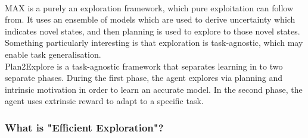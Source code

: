 \\ MAX \cite{DBLP:journals/corr/abs-1810-12162} is a purely an exploration framework, which pure exploitation can follow from. It uses an ensemble of models which are used to derive uncertainty which indicates novel states, and then planning is used to explore to those novel states. Something particularly interesting is that exploration is task-agnostic, which may enable task generalisation.
\\ Plan2Explore \cite{plan2explore} is a task-agnostic framework that separates learning in to two separate phases. During the first phase, the agent explores via planning and intrinsic motivation in order to learn an accurate model. In the second phase, the agent uses extrinsic reward to adapt to a specific task.

\subsubsection{What is "Efficient Exploration"?}




